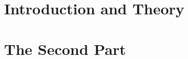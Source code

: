 \documentclass[11pt,a4paper,bibtotoc,idxtotoc,headsepline,footsepline,footexclude,BCOR12mm,DIV13]{scrbook}
\begin{document}
\frontmatter


    
    
    
    
    
    
    
    
    \tableofcontents
    
    

\mainmatter

    \part[Introduction and Theory]{Introduction and Theory}
    \label{part:introAndBackgroundTheory}
    
    
    
    \part[The 2nd Part]{The Second Part}
    \label{part:secondP}
    
    
    
    
    

\printindex
\glsaddall{}
\printglossaries


\clearemptydoublepage
%
%

%

\end{document}
